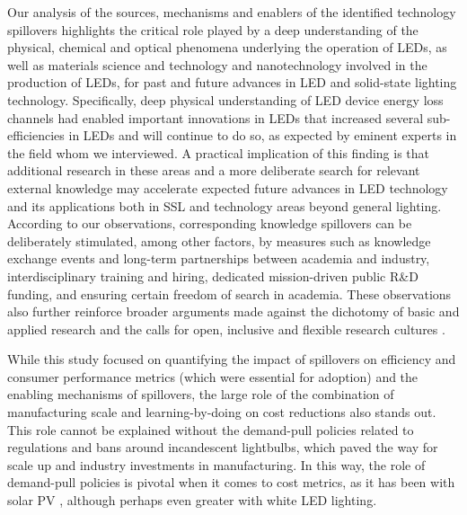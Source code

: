 \documentclass[parskip=full]{article}
\begin{document}
Our analysis of the sources, mechanisms and enablers of the identified technology spillovers highlights the critical role played by a deep understanding of the physical, chemical and optical phenomena underlying the operation of LEDs, as well as materials science and technology and nanotechnology involved in the production of LEDs, for past and future advances in LED and solid-state lighting technology. Specifically, deep physical understanding of LED device energy loss channels had enabled important innovations in LEDs that increased several sub-efficiencies in LEDs and will continue to do so, as expected by eminent experts in the field whom we interviewed. A practical implication of this finding is that additional research in these areas and a more deliberate search for relevant external knowledge may accelerate expected future advances in LED technology and its applications both in SSL and technology areas beyond general lighting. According to our observations, corresponding knowledge spillovers can be deliberately stimulated, among other factors, by measures such as knowledge exchange events and long-term partnerships between academia and industry, interdisciplinary training and hiring, dedicated mission-driven public R\&D funding, and ensuring certain freedom of search in academia. These observations also further reinforce broader arguments made against the dichotomy of basic and applied research \cite{narayanamurti2016cycles, narayanamurti2021genesis} and the calls for open, inclusive and flexible research cultures \cite{Stephan2021}.

While this study focused on quantifying the impact of spillovers on efficiency and consumer performance metrics (which were essential for adoption) and the enabling mechanisms of spillovers, the large role of the combination of manufacturing scale and learning-by-doing on cost reductions also stands out. This role cannot be explained without the demand-pull policies related to regulations and bans around incandescent lightbulbs, which paved the way for scale up and industry investments in manufacturing. In this way, the role of demand-pull policies is pivotal when it comes to cost metrics, as it has been with solar PV \cite{nemet2019solar}, although perhaps even greater with white LED lighting. 
\end{document}
